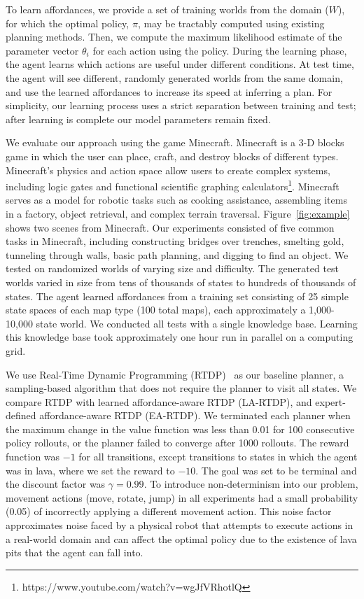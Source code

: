 To learn affordances, we provide a set of training worlds from the
domain ($W$), for which the optimal policy, $\pi$, may be tractably
computed using existing planning methods. Then, we compute the maximum
likelihood estimate of the parameter vector $\theta_i$ for each action
using the policy.  During the learning phase, the agent learns which
actions are useful under different conditions. At test time, the agent
will see different, randomly generated worlds from the same domain,
and use the learned affordances to increase its speed at inferring a
plan.  For simplicity, our learning process uses a strict separation
between training and test; after learning is complete our model
parameters remain fixed.

We evaluate our approach using the game Minecraft.  Minecraft is a 3-D
blocks game in which the user can place, craft, and destroy blocks of
different types.  Minecraft's physics and action space allow users to
create complex systems, including logic gates and functional
scientific graphing
calculators\footnote{https://www.youtube.com/watch?v=wgJfVRhotlQ}.
Minecraft serves as a model for robotic tasks such as cooking
assistance, assembling items in a factory, object retrieval, and
complex terrain traversal.  Figure~\ref{fig:example} shows two scenes
from Minecraft.  Our experiments consisted of five common tasks in
Minecraft, including constructing bridges over trenches, smelting
gold, tunneling through walls, basic path planning, and digging to
find an object.  We tested on randomized worlds of varying size and
difficulty. The generated test worlds varied in size from tens of
thousands of states to hundreds of thousands of states.  The agent
learned affordances from a training set consisting of 25 simple state
spaces of each map type (100 total maps), each approximately a
1,000-10,000 state world. We conducted all tests with a single
knowledge base. Learning this knowledge base took approximately one
hour run in parallel on a computing grid.


We use Real-Time Dynamic Programming (RTDP)~\cite{barto95} as our
baseline planner, a sampling-based algorithm that does not require the
planner to visit all states. We compare RTDP with learned
affordance-aware RTDP (LA-RTDP), and expert-defined affordance-aware
RTDP (EA-RTDP). We terminated each planner when the maximum change in
the value function was less than 0.01 for 100 consecutive policy
rollouts, or the planner failed to converge after 1000 rollouts.  The
reward function was $-1$ for all transitions, except transitions to
states in which the agent was in lava, where we set the reward to
$-10$. The goal was set to be terminal and the discount factor was
$\gamma = 0.99$.  To introduce non-determinism into our problem,
movement actions (move, rotate, jump) in all experiments had a small
probability (0.05) of incorrectly applying a different movement
action.  This noise factor approximates noise faced by a physical
robot that attempts to execute actions in a real-world domain and
can affect the optimal policy due to the existence of lava pits
that the agent can fall into. 


